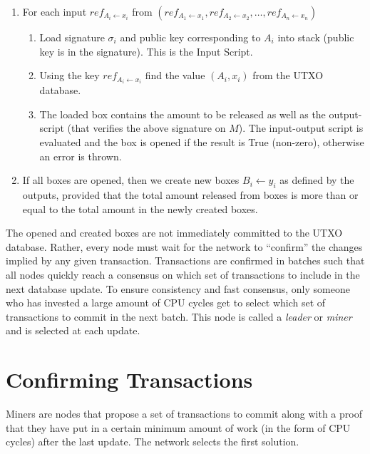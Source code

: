 \documentclass[]{report}   %
\newcommand{\la}{\leftarrow}
\newcommand{\lea}{\leftarrow}
\begin{document}
\begin{enumerate}
  \item	For each input $ref_{A_i\lea x_i}$ from $(ref_{A_1\leftarrow x_1}, ref_{A_2\leftarrow x_2}, \ldots, ref_{A_n\leftarrow x_n})$
	
	\begin{enumerate}
		\item Load signature $\sigma_i$ and public key corresponding to $A_i$ into stack (public key is in the signature). This is the Input Script.
		\item Using the key $ref_{A_i \lea x_i}$ find the value $(A_{i},  x_i)$ from the UTXO database. %
		\item The loaded box contains the amount to be released as well as the output-script (that verifies the above signature on $M$). The input-output script is evaluated and the box is opened if the result is True (non-zero), otherwise an error is thrown.
	\end{enumerate}
	\item If all boxes are opened, then we create new boxes $B_i\la y_i$ as defined by the outputs, provided that the total amount released from boxes is more than or equal to the total amount in the newly created boxes. 
\end{enumerate}

The opened and created boxes are not immediately committed to the UTXO database. Rather, every node must wait for the network to ``confirm'' the changes implied by any given transaction.  
Transactions are confirmed in batches such that all nodes quickly reach a consensus on which set of transactions to include in the next database update. 
To ensure consistency and fast consensus, only someone who has invested a large amount of CPU cycles get to select which set of transactions to commit in the next batch. This node is called a {\em leader} or {\em miner} and is selected at each update. 
 
\section{Confirming Transactions}
\label{sec:verify}
Miners are nodes that propose a set of transactions to commit along with a proof that they have put in a certain minimum amount of work (in the form of CPU cycles) after the last update. The network selects the first solution. 
\end{document}
